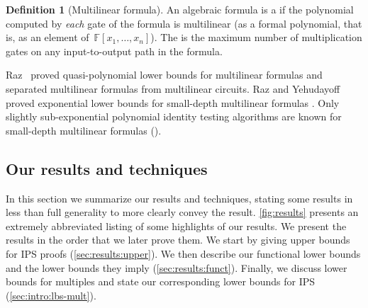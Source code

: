 \documentclass[11pt]{article}
\numberwithin{equation}{section}
\theoremstyle{definition}
\newtheorem{definition}[theorem]{Definition}
\theoremstyle{plain}
\begin{document}
\begin{definition}[Multilinear formula]\label{def-ml-fmla}
        An algebraic formula is a  if the polynomial computed by \emph{each} gate of the formula is multilinear (as a formal polynomial, that is, as an element of $\,\mathbb{F}[x_1,\ldots,x_n]$). The  is the maximum number of multiplication gates on any input-to-output path in the formula.
\end{definition}

Raz~\cite{Raz09,Raz06} proved quasi-polynomial lower bounds for multilinear formulas and separated multilinear formulas from multilinear circuits. Raz and Yehudayoff proved exponential lower bounds for small-depth
multilinear formulas \cite{RazYehudayoff09}. Only slightly sub-exponential polynomial identity testing algorithms are known for small-depth multilinear formulas (\cite{OliveiraSV15}).

\subsection{Our results and techniques}\label{sec:results}

In this section we summarize our results and techniques, stating some results in less than full generality to more clearly convey the result. \autoref{fig:results} presents an extremely abbreviated listing of some highlights
of our results.  We present the results in the order that we later prove them. We start by giving upper bounds for IPS proofs (\autoref{sec:results:upper}). We then describe our functional lower bounds and the \lIPS lower bounds they imply (\autoref{sec:results:funct}). Finally, we discuss lower bounds for multiples and state our corresponding lower bounds for IPS (\autoref{sec:intro:lbs-mult}).
\end{document}
